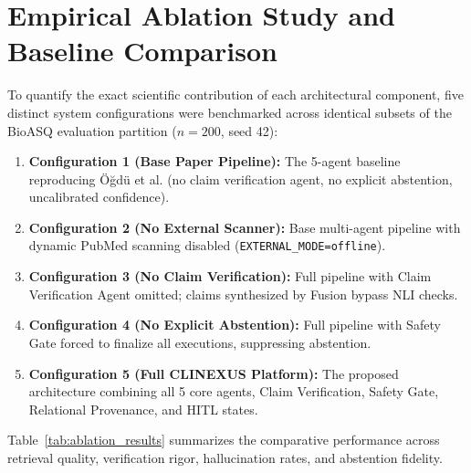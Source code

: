 \documentclass[12pt,a4paper]{report}
\begin{document}
\section{Empirical Ablation Study and Baseline Comparison}
To quantify the exact scientific contribution of each architectural component, five distinct system configurations were benchmarked across identical subsets of the BioASQ evaluation partition ($n=200$, seed 42):
\begin{enumerate}
    \item \textbf{Configuration 1 (Base Paper Pipeline):} The 5-agent baseline reproducing Öğdü et al. (no claim verification agent, no explicit abstention, uncalibrated confidence).
    \item \textbf{Configuration 2 (No External Scanner):} Base multi-agent pipeline with dynamic PubMed scanning disabled (\texttt{EXTERNAL\_MODE=offline}).
    \item \textbf{Configuration 3 (No Claim Verification):} Full pipeline with Claim Verification Agent omitted; claims synthesized by Fusion bypass NLI checks.
    \item \textbf{Configuration 4 (No Explicit Abstention):} Full pipeline with Safety Gate forced to finalize all executions, suppressing abstention.
    \item \textbf{Configuration 5 (Full CLINEXUS Platform):} The proposed architecture combining all 5 core agents, Claim Verification, Safety Gate, Relational Provenance, and HITL states.
\end{enumerate}

Table~\ref{tab:ablation_results} summarizes the comparative performance across retrieval quality, verification rigor, hallucination rates, and abstention fidelity.
\end{document}
